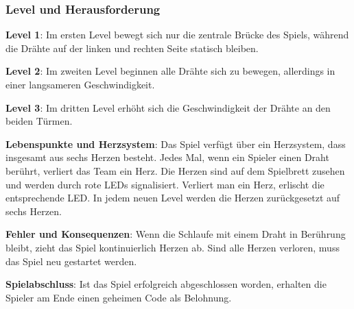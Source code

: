\subsubsection{Level und Herausforderung}

\begin{compactitem}
 \item \textbf{Level 1}: Im ersten Level bewegt sich nur die zentrale Brücke des Spiels, während die Drähte auf der linken und rechten Seite statisch bleiben.
 \item \textbf{Level 2}: Im zweiten Level beginnen alle Drähte sich zu bewegen, allerdings in einer langsameren Geschwindigkeit.
 \item \textbf{Level 3}: Im dritten Level erhöht sich die Geschwindigkeit der Drähte an den beiden Türmen.
\end{compactitem}

\textbf{Lebenspunkte und Herzsystem}: Das Spiel verfügt über ein Herzsystem, dass insgesamt aus sechs Herzen besteht. Jedes Mal, wenn ein Spieler einen Draht berührt, verliert das Team ein Herz. Die Herzen sind auf dem Spielbrett zusehen und werden durch rote LEDs signalisiert. Verliert man ein Herz, erlischt die entsprechende LED. In jedem neuen Level werden die Herzen zurückgesetzt auf sechs Herzen.

\textbf{Fehler und Konsequenzen}: Wenn die Schlaufe mit einem Draht in Berührung bleibt, zieht das Spiel kontinuierlich Herzen ab. Sind alle Herzen verloren, muss das Spiel neu gestartet werden.

\textbf{Spielabschluss}: Ist das Spiel erfolgreich abgeschlossen worden, erhalten die Spieler am Ende einen geheimen Code als Belohnung.
